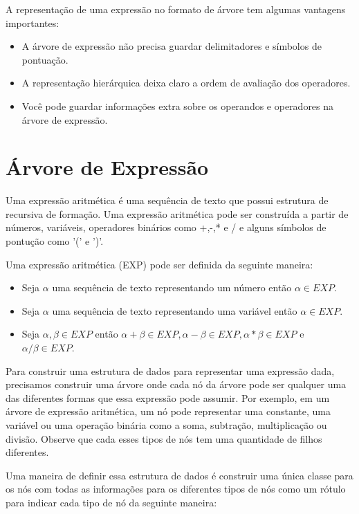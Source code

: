 A representação de uma expressão no formato de árvore tem algumas vantagens importantes:

\begin{itemize}
    \item A árvore de expressão não precisa guardar delimitadores e símbolos de pontuação.
    \item A representação hierárquica deixa claro a ordem de avaliação dos operadores.
    \item Você pode guardar informações extra sobre os operandos e operadores na árvore de expressão.
\end{itemize}



\section{Árvore de Expressão}

Uma expressão aritmética é uma sequência de texto que possui estrutura de recursiva de formação. Uma expressão aritmética pode ser construída a partir de números, variáveis, operadores binários como +,-,* e / e alguns símbolos de pontução como '(' e ')'. 

Uma expressão aritmética (EXP) pode ser definida da seguinte maneira:

\begin{itemize}
\item Seja $\alpha$ uma sequência de texto representando um número então $\alpha \in EXP$.
\item Seja $\alpha$ uma sequência de texto representando uma variável então $\alpha \in EXP$.
\item Seja $\alpha, \beta \in EXP$  então $\alpha + \beta \in EXP, \alpha - \beta \in EXP, \alpha * \beta \in EXP$ e $\alpha / \beta \in EXP$.
\end{itemize} 


Para construir uma estrutura de dados para representar uma expressão dada, precisamos construir uma árvore onde cada nó da árvore pode ser qualquer uma das diferentes formas que essa expressão pode assumir. Por exemplo, em um árvore de expressão aritmética, um nó pode representar uma constante, uma variável ou uma operação binária como a soma, subtração, multiplicação ou divisão. Observe que cada esses tipos de nós tem uma quantidade de filhos diferentes.

Uma maneira de definir essa estrutura de dados é construir uma única classe para os nós com todas as informações para os diferentes tipos de nós como um rótulo para indicar cada tipo de nó da seguinte maneira:

